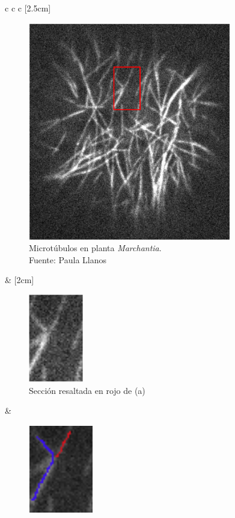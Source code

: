 \begin{figure}[h]
    \begin{tabular}{c c c}
        [2.5cm]{
        \begin{subfigure}[t]{0.4\textwidth}
        \includegraphics[scale=0.5]{imagenes/NoConsenso.png}
        \caption{Microt\'ubulos en planta {\it Marchantia}.\\Fuente: Paula Llanos}
        \label{fig:NoConsensoGeneral}
        \end{subfigure}  
        }
        &
        [2cm]{
        \begin{subfigure}[t]{0.25\textwidth}
        \includegraphics[]{imagenes/NoConsenso2.png}
        \caption{Secci\'on resaltada en rojo de (a)} %
        \label{fig:NoConsensoRect}
        \end{subfigure}
        }
        &
        \begin{subfigure}[t]{0.21\textwidth}
        \includegraphics[scale=0.8]{imagenes/NoConsenso3.png}

\end{subfigure}
\end{tabular}
\end{figure}
